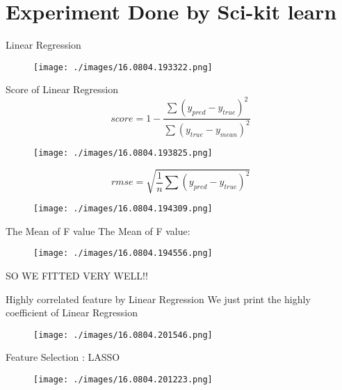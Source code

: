 \documentclass[bigger]{beamer}
\begin{document}
\section{Experiment Done by Sci-kit learn}
\label{sec-5}
\begin{frame}[label=sec-5-1]{Linear Regression}
\begin{figure}[htb]
\centering
\texttt{[image: ./images/16.0804.193322.png]}
\end{figure}
\end{frame}
\begin{frame}[label=sec-5-2]{Score of Linear Regression}
\begin{equation*}
score = 1-\frac{\sum(y_{pred}-y_{true})^2}{\sum(y_{true}-y_{mean})^{2}}
\end{equation*}

\begin{figure}[htb]
\centering
\texttt{[image: ./images/16.0804.193825.png]}
\end{figure}

\begin{equation*}
rmse = \sqrt{\frac{1}{n}\sum(y_{pred}-y_{true})^2}
\end{equation*}

\begin{figure}[htb]
\centering
\texttt{[image: ./images/16.0804.194309.png]}
\end{figure}
\end{frame}
\begin{frame}[label=sec-5-3]{The Mean of F value}
The Mean of F value: 
\begin{figure}[htb]
\centering
\texttt{[image: ./images/16.0804.194556.png]}
\end{figure}
SO WE FITTED VERY WELL!!
\end{frame}
\begin{frame}[label=sec-5-4]{Highly correlated feature by Linear Regression}
We just print the highly coefficient of Linear Regression
\begin{figure}[htb]
\centering
\texttt{[image: ./images/16.0804.201546.png]}
\end{figure}
\end{frame}

\begin{frame}[label=sec-5-5]{Feature Selection : LASSO}
\begin{figure}[htb]
\centering
\texttt{[image: ./images/16.0804.201223.png]}
\end{figure}
\end{frame}
\end{document}
